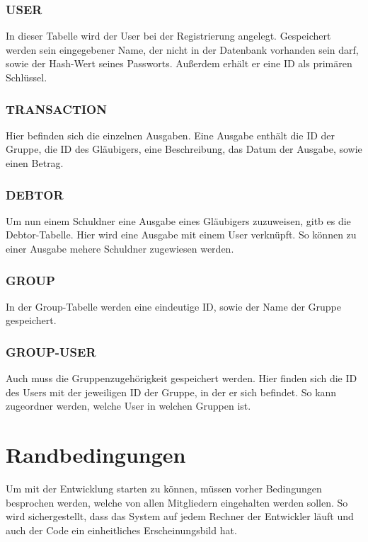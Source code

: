 \documentclass[conference]{IEEEtran}
\begin{document}
\subsubsection{USER}
In dieser Tabelle wird der User bei der Registrierung angelegt. Gespeichert werden sein eingegebener Name, der nicht in der Datenbank vorhanden sein darf, sowie der \gls{Hash-Wert} seines Passworts.
Außerdem erhält er eine ID als primären Schlüssel.
\subsubsection{TRANSACTION}
Hier befinden sich die einzelnen Ausgaben. Eine Ausgabe enthält die ID der Gruppe, die ID des Gläubigers, eine Beschreibung, das Datum der Ausgabe, sowie einen Betrag.
\subsubsection{DEBTOR}
Um nun einem \gls{Schuldner} eine Ausgabe eines Gläubigers zuzuweisen, gitb es die Debtor-Tabelle.
Hier wird eine Ausgabe mit einem User verknüpft. So können zu einer Ausgabe mehere Schuldner zugewiesen werden.
\subsubsection{GROUP}
In der Group-Tabelle werden eine eindeutige ID, sowie der Name der Gruppe gespeichert.
\subsubsection{GROUP-USER}
Auch muss die Gruppenzugehörigkeit gespeichert werden. Hier finden sich die ID des Users mit der jeweiligen ID der Gruppe, in der er sich befindet.
So kann zugeordner werden, welche User in welchen Gruppen ist.


\section{Randbedingungen}
Um mit der Entwicklung starten zu können, müssen vorher Bedingungen besprochen werden, welche von allen Mitgliedern eingehalten werden sollen.
So wird sichergestellt, dass das System auf jedem Rechner der Entwickler läuft und auch der Code ein einheitliches Erscheinungsbild hat.
\end{document}
